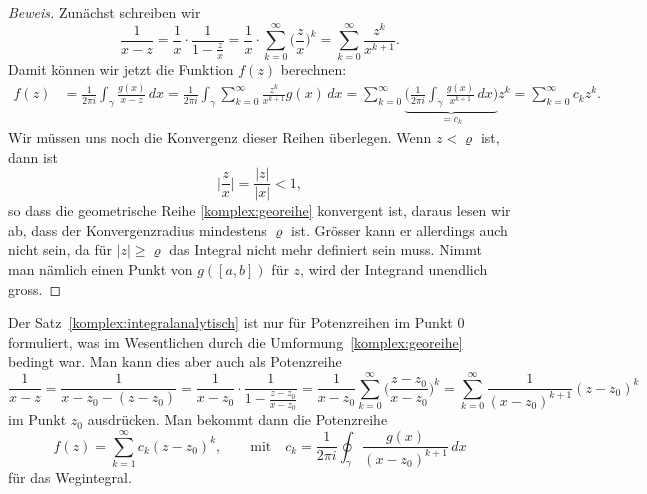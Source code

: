 \begin{proof}[Beweis]
Zunächst schreiben wir
\begin{equation}
\frac{1}{x-z}
=
\frac1x\cdot \frac{1}{1-\displaystyle\frac{z}{x}}
=
\frac1x\cdot \sum_{k=0}^\infty \biggl(\frac{z}{x}\biggr)^k
=
\sum_{k=0}^\infty \frac{z^k}{x^{k+1}}.
\label{komplex:georeihe}
\end{equation}
Damit können wir jetzt die Funktion $f(z)$ berechnen:
\begin{align*}
f(z)
&=
\frac1{2\pi i} \int_{\gamma} \frac{g(x)}{x-z}\,dx
=
\frac1{2\pi i} \int_{\gamma} \sum_{k=0}^\infty \frac{z^k}{x^{k+1}}g(x)\,dx
=
\sum_{k=0}^\infty
\underbrace{\biggl(\frac1{2\pi i} \int_{\gamma} \frac{g(x)}{x^{k+1}}\,dx\biggr)}_{\displaystyle =c_k}
z^k
=
\sum_{k=0}^\infty c_kz^k.
\end{align*}
Wir müssen uns noch die Konvergenz dieser Reihen überlegen.
Wenn $z<\varrho$ ist, dann ist
\[
\biggl|\frac{z}{x}\biggr| 
=
\frac{|z|}{|x|}
<1,
\]
so dass die geometrische Reihe \eqref{komplex:georeihe} konvergent ist,
daraus lesen wir ab, dass der Konvergenzradius mindestens $\varrho$
ist.
Grösser kann er allerdings auch nicht sein, da für $|z|\ge \varrho$
das Integral nicht mehr definiert sein muss.
Nimmt man nämlich einen Punkt von $g([a,b])$ für $z$, wird der Integrand
unendlich gross.
\end{proof}

Der Satz~\ref{komplex:integralanalytisch} ist nur für Potenzreihen
im Punkt $0$ formuliert, was im Wesentlichen durch die
Umformung~\eqref{komplex:georeihe} bedingt war.
Man kann dies aber auch als Potenzreihe
\[
\frac1{x-z}
=
\frac1{x-z_0-(z-z_0)}
=
\frac1{x-z_0}\cdot\frac1{1-\displaystyle\frac{z-z_0}{x-z_0}}
=
\frac1{x-z_0}\sum_{k=0}^\infty\biggl(\frac{z-z_0}{x-z_0}\biggr)^k
=
\sum_{k=0}^\infty\frac1{(x-z_0)^{k+1}}(z-z_0)^k
\]
im Punkt $z_0$ ausdrücken.
Man bekommt dann die Potenzreihe
\[
f(z) = \sum_{k=1}^\infty c_k(z-z_0)^k,\qquad
\text{mit}\quad
c_k=\frac1{2\pi i}\oint_\gamma\frac{g(x)}{(x-z_0)^{k+1}}\,dx
\]
für das Wegintegral.

%
%
